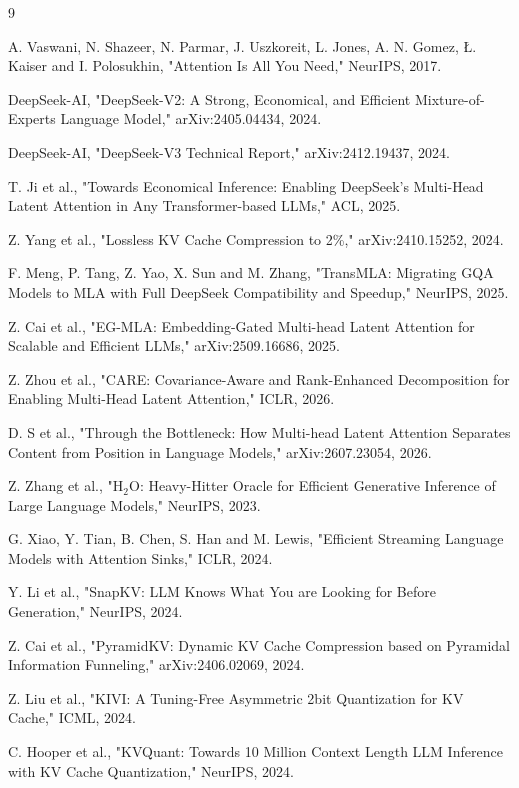 \documentclass[10pt]{article}
\begin{document}
\begin{thebibliography}{9}

 A. Vaswani, N. Shazeer, N. Parmar, J. Uszkoreit, L. Jones, A. N. Gomez, Ł. Kaiser and I. Polosukhin, "Attention Is All You Need," NeurIPS, 2017.

 DeepSeek-AI, "DeepSeek-V2: A Strong, Economical, and Efficient Mixture-of-Experts Language Model," arXiv:2405.04434, 2024.

 DeepSeek-AI, "DeepSeek-V3 Technical Report," arXiv:2412.19437, 2024.

 T. Ji et al., "Towards Economical Inference: Enabling DeepSeek's Multi-Head Latent Attention in Any Transformer-based LLMs," ACL, 2025.

 Z. Yang et al., "Lossless KV Cache Compression to 2\%," arXiv:2410.15252, 2024.

 F. Meng, P. Tang, Z. Yao, X. Sun and M. Zhang, "TransMLA: Migrating GQA Models to MLA with Full DeepSeek Compatibility and Speedup," NeurIPS, 2025.

 Z. Cai et al., "EG-MLA: Embedding-Gated Multi-head Latent Attention for Scalable and Efficient LLMs," arXiv:2509.16686, 2025.

 Z. Zhou et al., "CARE: Covariance-Aware and Rank-Enhanced Decomposition for Enabling Multi-Head Latent Attention," ICLR, 2026.

 D. S et al., "Through the Bottleneck: How Multi-head Latent Attention Separates Content from Position in Language Models," arXiv:2607.23054, 2026.

 Z. Zhang et al., "H$_2$O: Heavy-Hitter Oracle for Efficient Generative Inference of Large Language Models," NeurIPS, 2023.

 G. Xiao, Y. Tian, B. Chen, S. Han and M. Lewis, "Efficient Streaming Language Models with Attention Sinks," ICLR, 2024.

 Y. Li et al., "SnapKV: LLM Knows What You are Looking for Before Generation," NeurIPS, 2024.

 Z. Cai et al., "PyramidKV: Dynamic KV Cache Compression based on Pyramidal Information Funneling," arXiv:2406.02069, 2024.

 Z. Liu et al., "KIVI: A Tuning-Free Asymmetric 2bit Quantization for KV Cache," ICML, 2024.

 C. Hooper et al., "KVQuant: Towards 10 Million Context Length LLM Inference with KV Cache Quantization," NeurIPS, 2024.


\end{thebibliography}
\end{document}
